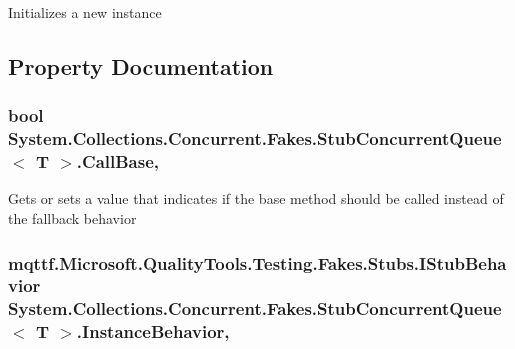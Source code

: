Initializes a new instance



\subsection{Property Documentation}
\hypertarget{class_system_1_1_collections_1_1_concurrent_1_1_fakes_1_1_stub_concurrent_queue_3_01_t_01_4_a7e62251bc9f1e0b549031be71bba672d}{
\subsubsection[{Call\-Base}]{\setlength{\rightskip}{0pt plus 5cm}bool System.\-Collections.\-Concurrent.\-Fakes.\-Stub\-Concurrent\-Queue$<$ T $>$.Call\-Base\hspace{0.3cm}{\ttfamily [get]}, {\ttfamily [set]}}}\label{class_system_1_1_collections_1_1_concurrent_1_1_fakes_1_1_stub_concurrent_queue_3_01_t_01_4_a7e62251bc9f1e0b549031be71bba672d}


Gets or sets a value that indicates if the base method should be called instead of the fallback behavior

\hypertarget{class_system_1_1_collections_1_1_concurrent_1_1_fakes_1_1_stub_concurrent_queue_3_01_t_01_4_a2f68550133215c3a6ef97ec4d91e50b4}{
\subsubsection[{Instance\-Behavior}]{\setlength{\rightskip}{0pt plus 5cm}mqttf.\-Microsoft.\-Quality\-Tools.\-Testing.\-Fakes.\-Stubs.\-I\-Stub\-Behavior System.\-Collections.\-Concurrent.\-Fakes.\-Stub\-Concurrent\-Queue$<$ T $>$.Instance\-Behavior\hspace{0.3cm}{\ttfamily [get]}, {\ttfamily [set]}}}\label{class_system_1_1_collections_1_1_concurrent_1_1_fakes_1_1_stub_concurrent_queue_3_01_t_01_4_a2f68550133215c3a6ef97ec4d91e50b4}


